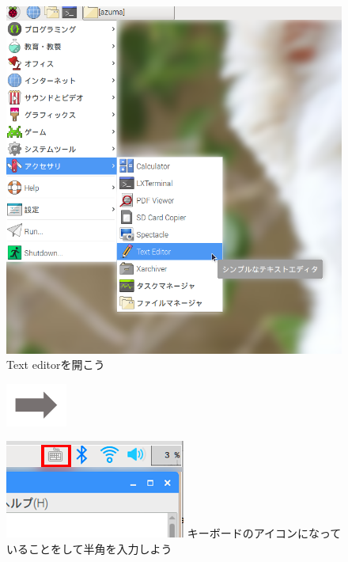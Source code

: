\begin{figure}
  \begin{minipage}{0.3\textwidth}
    \includegraphics[width=\linewidth]{text01-img/textbook-img067.png}
     Text editorを開こう
  \end{minipage}
  \includegraphics[width=2cm]{text01-img/textbook-img073.png}
  \begin{minipage}{0.3\textwidth}
    \includegraphics[width=\linewidth]{text01-img/textbook-img059.png}
     キーボードのアイコンになっていることをして半角を入力しよう
  \end{minipage}


\end{figure}
